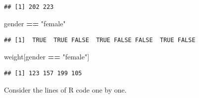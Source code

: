\documentclass[
]{krantz}
\newenvironment{Shaded}{\begin{snugshade}}{\end{snugshade}}
\newcommand{\NormalTok}[1]{#1}
\newcommand{\OperatorTok}[1]{\textcolor[rgb]{0.81,0.36,0.00}{\textbf{#1}}}
\newcommand{\StringTok}[1]{\textcolor[rgb]{0.31,0.60,0.02}{#1}}
\begin{document}
\begin{verbatim}
## [1] 202 223
\end{verbatim}

\begin{Shaded}
\begin{Highlighting}[]
\NormalTok{gender }\OperatorTok{==}\StringTok{ "female"}
\end{Highlighting}
\end{Shaded}

\begin{verbatim}
## [1]  TRUE  TRUE FALSE  TRUE FALSE FALSE  TRUE FALSE
\end{verbatim}

\begin{Shaded}
\begin{Highlighting}[]
\NormalTok{weight[gender }\OperatorTok{==}\StringTok{ "female"}\NormalTok{]}
\end{Highlighting}
\end{Shaded}

\begin{verbatim}
## [1] 123 157 199 105
\end{verbatim}

Consider the lines of R code one by one.
\end{document}
